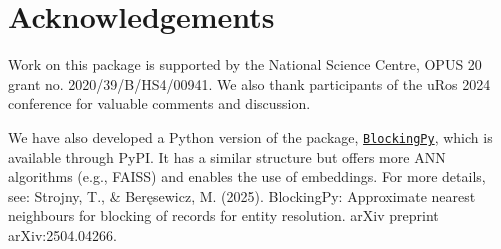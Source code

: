 \section{Acknowledgements}\label{acknowledgements}

Work on this package is supported by the National Science Centre, OPUS
20 grant no. 2020/39/B/HS4/00941. We also thank participants of the uRos
2024 conference for valuable comments and discussion.

We have also developed a Python version of the package,
\href{https://blockingpy.readthedocs.io/en/latest/}{\texttt{BlockingPy}}, which is
available through PyPI. It has a similar structure but offers more ANN
algorithms (e.g., FAISS) and enables the use of embeddings. For more
details, see: Strojny, T., \& Beręsewicz, M. (2025). BlockingPy:
Approximate nearest neighbours for blocking of records for entity
resolution. arXiv preprint arXiv:2504.04266.



\address{%
Maciej Beręsewicz\\
University of Economics and BusinessStatisical Office in Poznań\\%
Department of Statistics\\ Centre for the Methodology of Population Studies\\
%
\url{https://maciejberesewicz.com}\\%
\textit{ORCiD: \href{https://orcid.org/0000-0002-8281-4301}{0000-0002-8281-4301}}\\%
\href{mailto:maciej.beresewicz@poznan.pl}{\nolinkurl{maciej.beresewicz@poznan.pl}}%
}

\address{%
Adam Struzik\\
Adam Mickiewicz UniversityStatisical Office in Poznań\\%
Faculty of Mathematics and Computer Science\\ Centre for Urban Statistics\\
%
%
%
\href{mailto:adastr5@st.amu.edu.pl}{\nolinkurl{adastr5@st.amu.edu.pl}}%
}
